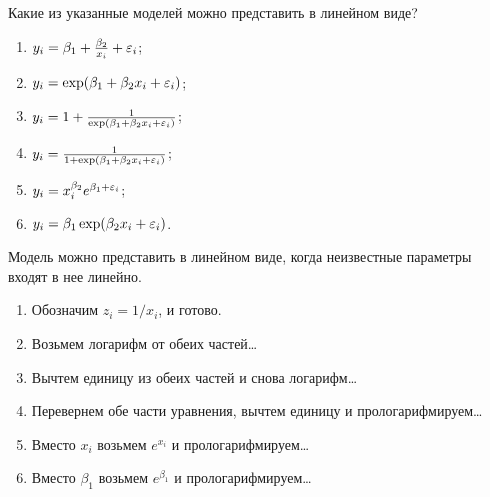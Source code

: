 \begin{problem} %
Какие из указанные моделей можно представить в линейном виде?
\begin{enumerate}
\item $y_i=\beta_1+\frac{\beta_2}{x_i}+\varepsilon_i$;
\item $y_i=\exp(\beta_1+\beta_2 x_i+\varepsilon_i)$;
\item $y_i=1+\frac{1}{\exp(\beta_1+\beta_2 x_i+\varepsilon_i)}$;
\item $y_i=\frac{1}{1+\exp(\beta_1+\beta_2 x_i+\varepsilon_i)}$;
\item $y_i=x_i^{\beta_2}e^{\beta_1+\varepsilon_i}$;
\item $y_i=\beta_1\exp(\beta_2 x_i + \varepsilon_i)$.
\end{enumerate}


\begin{sol}
Модель можно представить в линейном виде, когда неизвестные параметры входят в нее линейно.
\begin{enumerate}
\item Обозначим $z_i = 1/x_i$, и готово.
\item Возьмем логарифм от обеих частей\ldots
\item Вычтем единицу из обеих частей и снова логарифм\ldots
\item Перевернем обе части уравнения, вычтем единицу и прологарифмируем\ldots
\item Вместо $x_i$ возьмем $e^{x_i}$ и прологарифмируем\ldots
\item Вместо $\beta_1$ возьмем $e^{\beta_1}$ и прологарифмируем\ldots
\end{enumerate}
\end{sol}
\end{problem}




